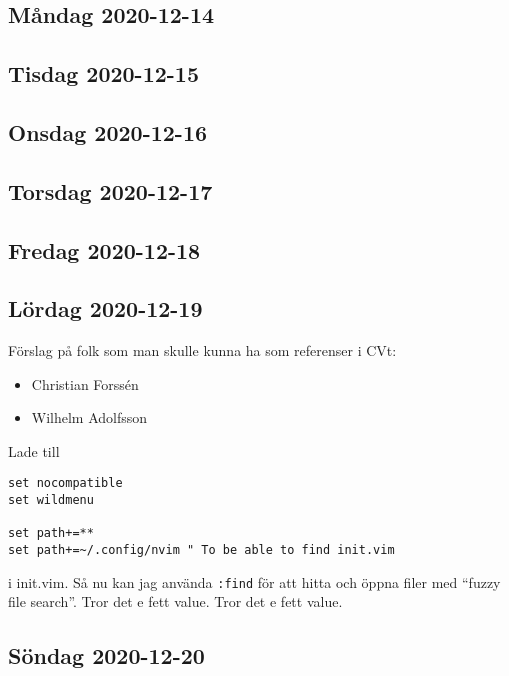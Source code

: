 
\subsection{Måndag 2020-12-14}
\subsection{Tisdag 2020-12-15}
\subsection{Onsdag 2020-12-16}
\subsection{Torsdag 2020-12-17}
\subsection{Fredag 2020-12-18}
\subsection{Lördag 2020-12-19}

Förslag på folk som man skulle kunna ha som referenser i CVt:
\begin{itemize}
	\item Christian Forssén
	\item Wilhelm Adolfsson
\end{itemize}

\bigskip

Lade till
\begin{verbatim}
set nocompatible
set wildmenu

set path+=**
set path+=~/.config/nvim " To be able to find init.vim
\end{verbatim}
i init.vim. Så nu kan jag använda \verb|:find| för att hitta och öppna filer med \enquote{fuzzy file search}. Tror det e fett value. Tror det e fett value.


\subsection{Söndag 2020-12-20}



